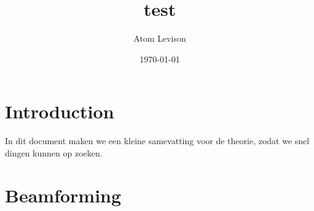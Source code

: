 \documentclass{article}
\title{test}
\author{Atom Levison}
\date{\today}
\begin{document}
\maketitle

\section{Introduction}
In dit document maken we een kleine samevatting voor de theorie, zodat we snel dingen kunnen op zoeken.
\section{Beamforming}
\end{document}
